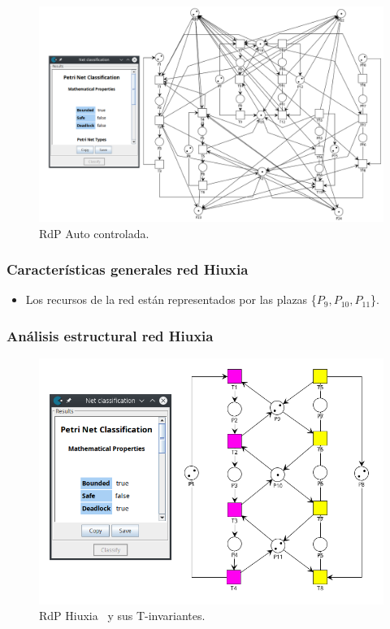 \begin{figure}[H]
	\centering
	\includegraphics[scale=0.45]{Figures/testing/auto-controlada.png}
	\caption[RdP Auto controlada]{RdP Auto controlada.}
	\label{fig:amscontrolada}
 \end{figure} 


\subsubsection{Características generales red Hiuxia}
\begin{itemize}
    \item Los recursos de la red están representados por las plazas \{$P_{9},P_{10},P_{11}$\}.
\end{itemize}

\subsubsection{Análisis estructural red Hiuxia}
\hfill
\begin{figure}[H]
	\centering
	\includegraphics[scale=0.6]{Figures/testing/hiuxia-t-inv.png}
	\caption[RdP Hiuxia y sus T-invariantes.]{RdP Hiuxia \footnotemark \ y sus T-invariantes.}
	\label{fig:hiuxiainvariantes}
 \end{figure} 


